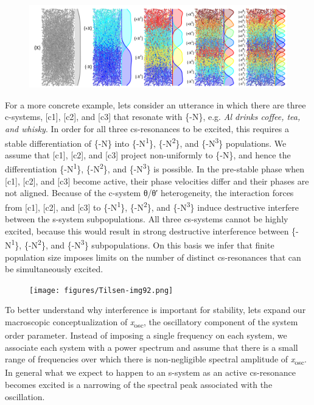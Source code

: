   
\begin{figure}
\includegraphics[width=\textwidth]{figures/Tilsen-img91.png}
\caption{\missingcaption}
\label{fig:}
\end{figure}
 

  For a more concrete example, lets consider an utterance in which there are three c-systems, [c1], [c2], and [c3] that resonate with \{-N\}, e.g. \textit{Al drinks coffee, tea, and whisky}. In order for all three cs-resonances to be excited, this requires a stable differentiation of \{-N\} into \{-N\textsuperscript{1}\}, \{-N\textsuperscript{2}\}, and \{-N\textsuperscript{3}\} populations. We assume that [c1], [c2], and [c3] project non-uniformly to \{-N\}, and hence the differentiation \{-N\textsuperscript{1}\}, \{-N\textsuperscript{2}\}, and \{-N\textsuperscript{3}\} is possible. In the pre-stable phase when [c1], [c2], and [c3] become active, their phase velocities differ and their phases are not aligned. Because of the c-system θ/θ′ heterogeneity, the interaction forces from [c1], [c2], and [c3] to \{-N\textsuperscript{1}\}, \{-N\textsuperscript{2}\}, and \{-N\textsuperscript{3}\} induce destructive interfere between the s-system subpopulations. All three cs-systems cannot be highly excited, because this would result in strong destructive interference between \{-N\textsuperscript{1}\}, \{-N\textsuperscript{2}\}, and \{-N\textsuperscript{3}\} subpopulations. On this basis we infer that finite population size imposes limits on the number of distinct cs-resonances that can be simultaneously excited.

  
\begin{figure}
\texttt{[image: figures/Tilsen-img92.png]}
\caption{\missingcaption}
\label{fig:}
\end{figure}
 

  To better understand why interference is important for stability, lets expand our macroscopic conceptualization of \textit{x}\textsubscript{osc}, the oscillatory component of the system order parameter. Instead of imposing a single frequency on each system, we associate each system with a power spectrum and assume that there is a small range of frequencies over which there is non-negligible spectral amplitude of \textit{x}\textsubscript{osc}. In general what we expect to happen to an s-system as an active cs-resonance becomes excited is a narrowing of the spectral peak associated with the oscillation.

